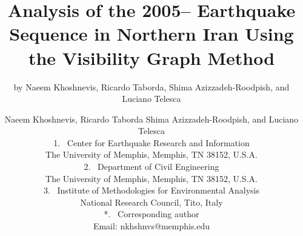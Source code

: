
\title{%
    Analysis of the 2005-- Earthquake Sequence in Northern Iran Using the Visibility Graph Method
}

\makeatletter
\if@twocolumn
    \date{}
    \renewcommand*\@fnsymbol[1]{\the#1}
    \author{by Naeem Khoshnevis, Ricardo Taborda, Shima Azizzadeh-Roodpish, and Luciano Telesca}
\else
    \author{
        Naeem Khoshnevis, Ricardo Taborda Shima Azizzadeh-Roodpish, and Luciano Telesca\\
        \normalsize\normalfont    	    	
        \vspace{20pt}
        1.~
        Center for Earthquake Research and Information\\
        \hspace{1.1em} The University of Memphis, Memphis, TN 38152, U.S.A.\\
        \vspace{20pt}
        2.~
        Department of Civil Engineering\\
        \hspace{1.1em} The University of Memphis, Memphis, TN 38152, U.S.A.\\
        \vspace{20pt}
        3.~
        Institute of Methodologies for Environmental Analysis\\
        \hspace{1.1em} National Research Council, Tito, Italy\\
        \vspace{20pt}
        *.~
        Corresponding author\\
        \hspace{1.1em} Email: nkhshnvs@memphis.edu\\
        \vspace{40pt}
    }
\fi
\makeatother


